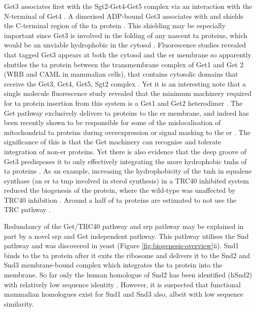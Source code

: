Get3 associates first with the Sgt2\--Get4\--Get5 complex via an interaction with the N-terminal of Get4 \cite{Wang2010}.
A dimerised ADP-bound Get3 \cite{Mateja2009, Hu2009, Bozkurt2009, Suloway2009, Yamagata2010} associates with and shields the C\--terminal region of the \gls{ta} protein \cite{Stefanovic2007, Schuldiner2008, Favaloro2008}.
This shielding may be especially important since Get3 is involved in the folding of any nascent \gls{ta} proteins, which would be an unviable hydrophobic in the cytosol \cite{Jonikas2009}.
Fluorescence studies revealed that tagged Get3 appears at both the cytosol and the \gls{er} membrane so apparently shuttles the \gls{ta} protein between the transmembrane complex of Get1 and Get 2 (WRB and CAML in mammalian cells), that contains cytosolic domains that receive the Get3, Get4, Get5, Sgt2 complex \cite{Huh2003, Zalisko2017}.
Yet it is an interesting note that a single molecule fluorescence study revealed that the minimum machinery required for \gls{ta} protein insertion from this system is a Get1 and Get2 heterodimer \cite{Zalisko2017}.
The Get pathway exclusively delivers \gls{ta} proteins to the \gls{er} membrane, and indeed has been recently shown to be responsible for some of the mislocalisation of mitochondrial \gls{ta} proteins during overexpression or signal masking to the \gls{er} \cite{Vitali2018}.
The significance of this is that the Get machinery can recognise and tolerate integration of non\--\gls{er} proteins.
Yet there is also evidence that the deep groove of Get3 \cite{Mariappan2011, Stefer2011} predisposes it to only effectively integrating the more hydrophobic \gls{tmh}s of \gls{ta} proteins \cite{Wang2010, Rao2016}.
As an example, increasing the hydrophobicity of the \gls{tmh} in squalene synthase (an \gls{er} \gls{ta} \gls{tmp} involved in sterol synthesis) in a TRC40 inhibited system reduced the biogenesis of the protein, where the wild\--type was unaffected by TRC40 inhibition \cite{Guna2018a}.
Around a half of \gls{ta} proteins are estimated to not use the TRC pathway \cite{Guna2018a}.

Redundancy of the Get/TRC40 pathway and \gls{srp} pathway may be explained in part by a novel \gls{srp} and Get independent pathway.
This pathway utilises the Snd pathway and was discovered in yeast \cite{Aviram2016} (Figure \ref{fig:biogenesis-overview}ii).
Snd1 binds to the \gls{ta} protein after it exits the ribosome and delivers it to the Snd2 and Snd3 membrane\--bound complex which integrates the \gls{ta} protein into the membrane.
So far only the human homologue of Snd2 has been identified (hSnd2) with relatively low sequence identity \cite{Haßdenteufel2017}.
However, it is suspected that functional mammalian homologues exist for Snd1 and Snd3 also, albeit with low sequence similarity.

